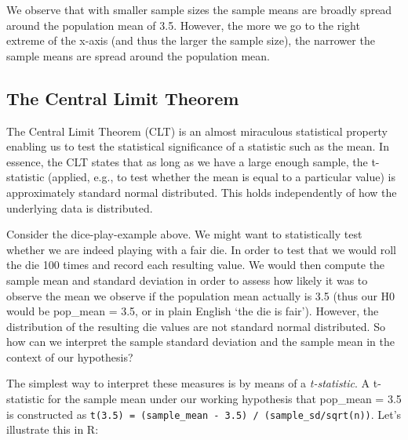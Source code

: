 \documentclass[
  12pt,
]{style/krantz}
\begin{document}
We observe that with smaller sample sizes the sample means are broadly spread around the population mean of 3.5. However, the more we go to the right extreme of the x-axis (and thus the larger the sample size), the narrower the sample means are spread around the population mean.

\hypertarget{the-central-limit-theorem}{%
\subsection{The Central Limit Theorem}\label{the-central-limit-theorem}}

The Central Limit Theorem (CLT) is an almost miraculous statistical property enabling us to test the statistical significance of a statistic such as the mean. In essence, the CLT states that as long as we have a large enough sample, the t-statistic (applied, e.g., to test whether the mean is equal to a particular value) is approximately standard normal distributed. This holds independently of how the underlying data is distributed.

Consider the dice-play-example above. We might want to statistically test whether we are indeed playing with a fair die. In order to test that we would roll the die 100 times and record each resulting value. We would then compute the sample mean and standard deviation in order to assess how likely it was to observe the mean we observe if the population mean actually is 3.5 (thus our H0 would be pop\_mean = 3.5, or in plain English `the die is fair'). However, the distribution of the resulting die values are not standard normal distributed. So how can we interpret the sample standard deviation and the sample mean in the context of our hypothesis?

The simplest way to interpret these measures is by means of a \emph{t-statistic}. A t-statistic for the sample mean under our working hypothesis that pop\_mean = 3.5 is constructed as \texttt{t(3.5)\ =\ (sample\_mean\ -\ 3.5)\ /\ (sample\_sd/sqrt(n))}. Let's illustrate this in R:
\end{document}
